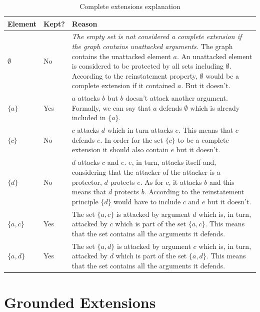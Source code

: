 \documentclass{scrbook}
\begin{document}
\begin{table}
    \begin{tabularx}{\linewidth}{|p{5em}|p{4em}|X|} \hline
         \textbf{Element} & \textbf{Kept?} & \textbf{Reason} \\ \hline

        $\emptyset$ & No &
        \textit{The empty set is not considered a complete extension if the graph contains unattacked arguments.}
        The graph contains the unattacked element $a$. An unattacked element is considered to be protected by all sets including $\emptyset$. According to the reinstatement property, $\emptyset$ would be a complete extension if it contained $a$. But it doesn't.\\ \hline

        $\{a\}$ & Yes &
        $a$ attacks $b$ but $b$ doesn't attack another argument. Formally, we can say that $a$ defends $\emptyset$ which is already included in $\{a\}$.\\ \hline

        $\{c\}$ & No &
        $c$ attacks $d$ which in turn attacks $e$. This means that $c$ defends $e$. In order for the set $\{c\}$ to be a complete extension it should also contain $e$ but it doesn't.\\ \hline

        $\{d\}$ & No &
        $d$ attacks $c$ and $e$. $e$, in turn, attacks itself and, considering that the attacker of the attacker is a protector, $d$ protects $e$.
        As for $c$, it attacks $b$ and this means that $d$ protects $b$. According to the reinstatement principle $\{d\}$ would have to include $c$ and $e$ but it doesn't.\\ \hline

        $\{a,c\}$ & Yes &
        The set $\{a,c\}$ is attacked by argument $d$ which is, in turn, attacked by $c$ which is part of the set $\{a,c\}$. This means that the set contains all the arguments it defends.\\ \hline

        $\{a,d\}$ & Yes &
        The set $\{a,d\}$ is attacked by argument $c$ which is, in turn, attacked by $d$ which is part of the set $\{a,d\}$. This means that the set contains all the arguments it defends.\\ \hline
    \end{tabularx}
    \caption{Complete extensions explanation}
\end{table}

\section{Grounded Extensions}
\end{document}
